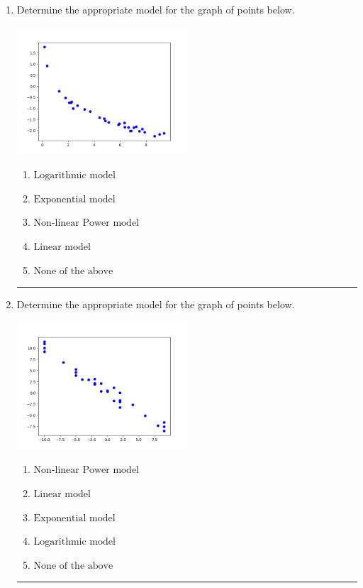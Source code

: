 \documentclass[14pt]{extbook}
\newcommand{\litem}[1]{\item#1\hspace*{-1cm}\rule{\textwidth}{0.4pt}}
\begin{document}
\begin{enumerate}
{\begin{enumerate}[label=\Alph*.]
\end{enumerate} }
\litem{
Determine the appropriate model for the graph of points below.
\begin{center}
    \includegraphics[width=0.5\textwidth]{../Figures/identifyModelGraph12CopyA.png}
\end{center}
\begin{enumerate}[label=\Alph*.]
\item \( \text{Logarithmic model} \)
\item \( \text{Exponential model} \)
\item \( \text{Non-linear Power model} \)
\item \( \text{Linear model} \)
\item \( \text{None of the above} \)

\end{enumerate} }
\litem{
Determine the appropriate model for the graph of points below.
\begin{center}
    \includegraphics[width=0.5\textwidth]{../Figures/identifyModelGraph12A.png}
\end{center}
\begin{enumerate}[label=\Alph*.]
\item \( \text{Non-linear Power model} \)
\item \( \text{Linear model} \)
\item \( \text{Exponential model} \)
\item \( \text{Logarithmic model} \)
\item \( \text{None of the above} \)


\end{enumerate}}
\end{enumerate}
\end{document}
